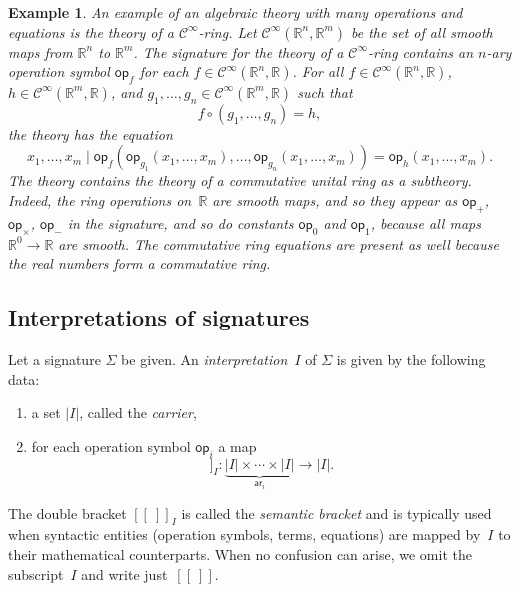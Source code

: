 \documentclass{amsart}
\newcommand{\RR}{\mathbb{R}} %
\newcommand{\op}[1]{\mathsf{op}_{#1}} %
\newcommand{\arity}[1]{\mathsf{ar}_{#1}} %
\newcommand{\Cinfty}{\mathcal{C}^\infty}
\newcommand{\sem}[1]{[\![#1]\!]} %
\newtheorem{example}[definition]{Example}
\begin{document}
\begin{example}
  \label{ex:Cinfty-theory}
  An example of an algebraic theory with many operations and equations is the theory of a
  $\Cinfty$-ring. Let $\Cinfty(\RR^n, \RR^m)$ be the set of all smooth maps from $\RR^n$
  to $\RR^m$. The signature for the theory of a $\Cinfty$-ring contains an $n$-ary
  operation symbol $\op{f}$ for each $f \in \Cinfty(\RR^n, \RR)$. For all
  $f \in \Cinfty(\RR^n, \RR)$, $h \in \Cinfty(\RR^m, \RR)$, and
  $g_1, \ldots, g_n \in \Cinfty(\RR^m, \RR)$ such that
  \begin{equation*}
    f \circ (g_1, \ldots, g_n) = h,
  \end{equation*}
  the theory has the equation
  \begin{equation*}
    x_1, \ldots, x_m \mid
    \op{f} (\op{g_1}(x_1, \ldots, x_m), \ldots, \op{g_n}(x_1, \ldots, x_m)) =
    \op{h}(x_1, \ldots, x_m).
  \end{equation*}
  The theory contains the theory of a commutative unital ring as a subtheory. Indeed,
  the ring operations on~$\RR$ are smooth maps, and so they appear as $\op{+}$,
  $\op{\times}$, $\op{-}$ in the signature, and so do constants $\op{0}$ and $\op{1}$,
  because all maps $\RR^0 \to \RR$ are smooth. The commutative ring equations are present
  as well because the real numbers form a commutative ring.
\end{example}


\subsection{Interpretations of signatures}
\label{sec:interp-of-sign}

Let a signature $\Sigma$ be given. An \emph{interpretation~$I$} of $\Sigma$ is given by
the following data:
%
\begin{enumerate}
\item a set $|I|$, called the \emph{carrier},
\item for each operation symbol $\op{i}$ a map
  \begin{equation*}
    \sem{\op{i}}_I : \underbrace{|I| \times \cdots \times |I|}_{\arity{i}} \to |I|.
  \end{equation*}
\end{enumerate}
%
The double bracket $\sem{{\ }}_I$ is called the \emph{semantic bracket} and is typically
used when syntactic entities (operation symbols, terms, equations) are mapped by~$I$ to
their mathematical counterparts. When no confusion can arise, we omit the subscript~$I$
and write just~$\sem{{\ }}$.
\end{document}
